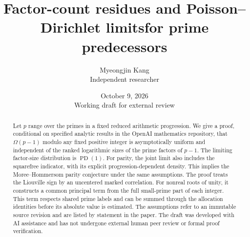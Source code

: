 \documentclass[11pt]{article}
\title{Factor-count residues and Poisson--Dirichlet limits\newline for prime predecessors}
\author{Myeongjin Kang\\\small Independent researcher}
\date{October 9, 2026\\[3pt]\small Working draft for external review}
\numberwithin{equation}{section}
\theoremstyle{definition}
\theoremstyle{remark}
\newcommand{\PD}{\operatorname{PD}}
\begin{document}
\maketitle
\begin{abstract}
Let $p$ range over the primes in a fixed reduced arithmetic progression.
We give a proof, conditional on specified analytic results in the OpenAI
mathematics repository, that $\Omega(p-1)$ modulo any fixed positive integer
is asymptotically uniform and independent of the ranked logarithmic sizes
of the prime factors of $p-1$. The limiting factor-size distribution is
$\PD(1)$. For parity, the joint limit also includes the squarefree indicator,
with its explicit progression-dependent density. This implies the
Moree--Hommersom parity conjecture under the same assumptions.
The proof treats the Liouville sign by an uncentered marked correlation.
For nonreal roots of unity, it constructs a common principal term from the
full small-prime part of each integer. This term respects shared prime
labels and can be summed through the allocation identities before its
absolute value is estimated. The assumptions refer to an immutable source
revision and are listed by statement in the paper. The draft was developed
with AI assistance and has not undergone external human peer review or
formal proof verification.
\end{abstract}
\tableofcontents
\clearpage







\begingroup
\small

\endgroup
\end{document}
